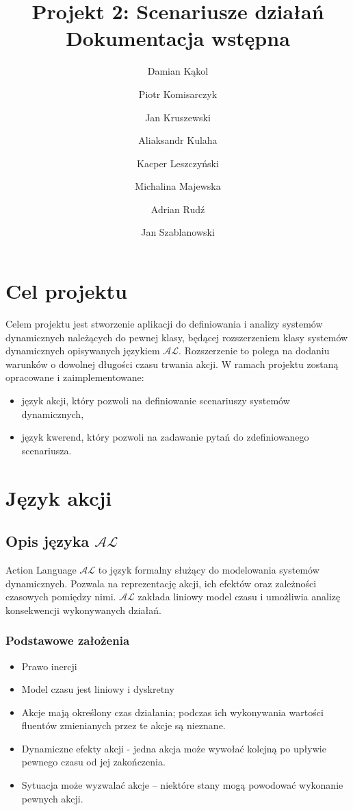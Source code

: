 \documentclass{article}
\title{Projekt 2: Scenariusze działań \\ \large{Dokumentacja wstępna}}
\author{Damian Kąkol
	\and Piotr Komisarczyk
	\and Jan Kruszewski
	\and Aliaksandr Kulaha
	\and Kacper Leszczyński
	\and Michalina Majewska
	\and Adrian Rudź
	\and Jan Szablanowski}
\begin{document}
\maketitle
\tableofcontents

\newpage

\section{Cel projektu}
Celem projektu jest stworzenie aplikacji do definiowania i analizy systemów dynamicznych należących do pewnej klasy, będącej rozszerzeniem klasy systemów dynamicznych opisywanych językiem $\mathcal{AL}$.
Rozszerzenie to polega na dodaniu warunków o dowolnej długości czasu trwania akcji. W ramach projektu zostaną opracowane i zaimplementowane:
\begin{itemize}
	\item język akcji, który pozwoli na definiowanie scenariuszy systemów dynamicznych,
	\item język kwerend, który pozwoli na zadawanie pytań do zdefiniowanego scenariusza.
\end{itemize}	


\section{Język akcji}

\subsection{Opis języka \texorpdfstring{$\mathcal{AL}$}{AL}}
\label{sec:opis-jezyka-al}

Action Language $\mathcal{AL}$ to język formalny służący do modelowania systemów dynamicznych. Pozwala na reprezentację akcji, ich efektów oraz zależności czasowych pomiędzy nimi. $\mathcal{AL}$ zakłada liniowy model czasu i umożliwia analizę konsekwencji wykonywanych działań.

\subsubsection{Podstawowe założenia}
\begin{itemize}
    \item Prawo inercji
    \item Model czasu jest liniowy i dyskretny
    \item Akcje mają określony czas działania; podczas ich wykonywania wartości fluentów zmienianych przez te akcje są nieznane.
    \item Dynamiczne efekty akcji - jedna akcja może wywołać kolejną po upływie pewnego czasu od jej zakończenia.
    \item Sytuacja może wyzwalać akcje – niektóre stany mogą powodować wykonanie pewnych akcji.
\end{itemize}
\end{document}
